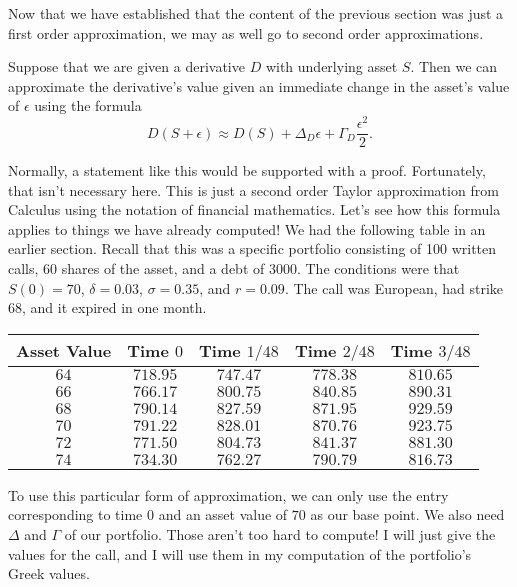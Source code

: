 \documentclass{ximera}
\begin{document}
Now that we have established that the content of the previous section was just a first order approximation, we may as well go to second order approximations.

\begin{theorem}
Suppose that we are given a derivative $D$ with underlying asset $S$. Then we can approximate the derivative's value given an immediate change in the asset's value of $\epsilon$ using the formula
	\begin{equation*}
	D(S+\epsilon)\approx D(S)+\Delta_D\epsilon+\Gamma_D\frac{\epsilon^2}{2}.
	\end{equation*}
\end{theorem}

Normally, a statement like this would be supported with a proof. Fortunately, that isn't necessary here. This is just a second order Taylor approximation from Calculus using the notation of financial mathematics. Let's see how this formula applies to things we have already computed! We had the following table in an earlier section. Recall that this was a specific portfolio consisting of 100 written calls, 60 shares of the asset, and a debt of $3000$. The conditions were that $S(0)=70$, $\delta=0.03$, $\sigma=0.35$, and $r=0.09$. The call was European, had strike 68, and it expired in one month. 

\begin{center}
	\begin{tabular}{c|cccc}
	Asset Value 	& Time $0$ 	& Time $1/48$ 	& Time $2/48$ 	& Time $3/48$\\
	\hline
	$64$		& $718.95$	& $747.47$		& $778.38$		& $810.65$\\
	$66$		& $766.17$	& $800.75$		& $840.85$		& $890.31$\\
	$68$		& $790.14$	& $827.59$		& $871.95$		& $929.59$\\
	$70$		& $791.22$	& $828.01$		& $870.76$		& $923.75$\\
	$72$		& $771.50$	& $804.73$		& $841.37$		& $881.30$\\
	$74$		& $734.30$	& $762.27$		& $790.79$		& $816.73$
	\end{tabular}
\end{center}

To use this particular form of approximation, we can only use the entry corresponding to time 0 and an asset value of $70$ as our base point. We also need $\Delta$ and $\Gamma$ of our portfolio. Those aren't too hard to compute! I will just give the values for the call, and I will use them in my computation of the portfolio's Greek values.
\end{document}
